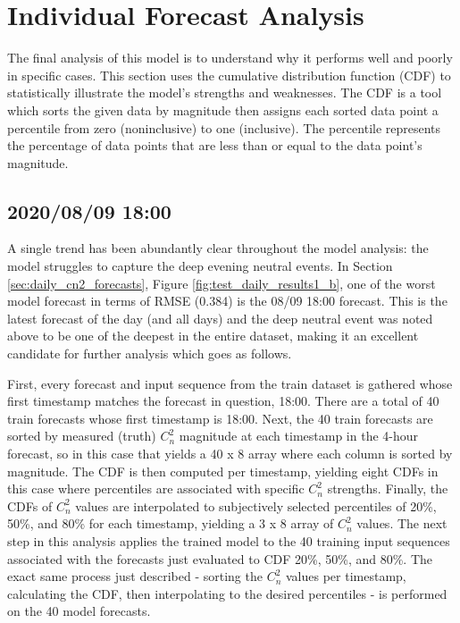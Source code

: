 \section{Individual Forecast Analysis}
The final analysis of this model is to understand why it performs well and poorly in specific cases. This section uses the cumulative distribution function (CDF) to statistically illustrate the model's strengths and weaknesses. The CDF is a tool which sorts the given data by magnitude then assigns each sorted data point a percentile from zero (noninclusive) to one (inclusive). The percentile represents the percentage of data points that are less than or equal to the data point's magnitude.

\subsection{2020/08/09 18:00}
A single trend has been abundantly clear throughout the model analysis: the model struggles to capture the deep evening neutral events. In Section \ref{sec:daily_cn2_forecasts}, Figure \ref{fig:test_daily_results1_b}, one of the worst model forecast in terms of RMSE (0.384) is the 08/09 18:00 forecast. This is the latest forecast of the day (and all days) and the deep neutral event was noted above to be one of the deepest in the entire dataset, making it an excellent candidate for further analysis which goes as follows.

First, every forecast and input sequence from the train dataset is gathered whose first timestamp matches the forecast in question, 18:00. There are a total of 40 train forecasts whose first timestamp is 18:00. Next, the 40 train forecasts are sorted by measured (truth) $C_{n}^{2}$ magnitude at each timestamp in the 4-hour forecast, so in this case that yields a 40 x 8 array where each column is sorted by magnitude. The CDF is then computed per timestamp, yielding eight CDFs in this case where percentiles are associated with specific $C_{n}^{2}$ strengths. Finally, the CDFs of $C_{n}^{2}$ values are interpolated to subjectively selected percentiles of  20\%, 50\%, and 80\% for each timestamp, yielding a 3 x 8 array of $C_{n}^{2}$ values. The next step in this analysis applies the trained model to the 40 training input sequences associated with the forecasts just evaluated to CDF 20\%, 50\%, and 80\%. The exact same process just described - sorting the $C_{n}^{2}$ values per timestamp, calculating the CDF, then interpolating to the desired percentiles - is performed on the 40 model forecasts.


